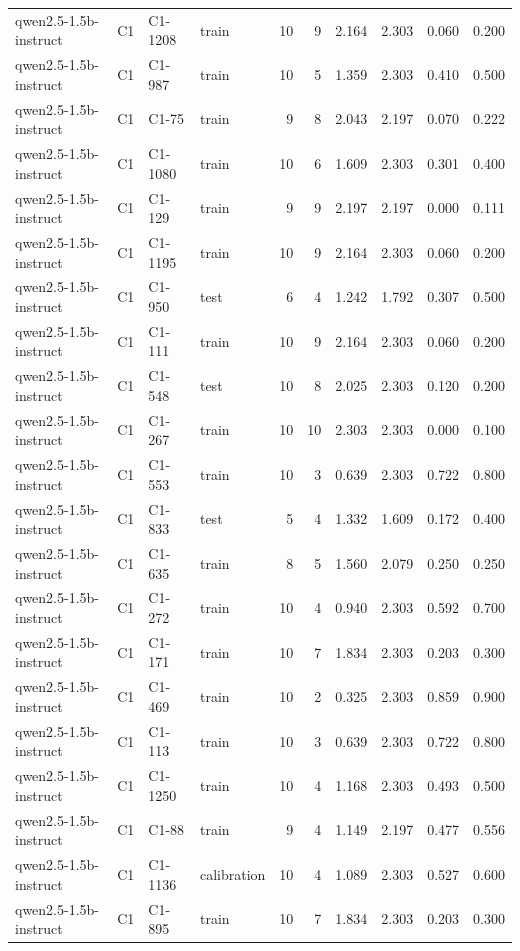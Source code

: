 \begin{table}
\begin{tabular}{llllrrrrrr}
qwen2.5-1.5b-instruct & C1 & C1-1208 & train & 10 & 9 & 2.164 & 2.303 & 0.060 & 0.200 \\
qwen2.5-1.5b-instruct & C1 & C1-987 & train & 10 & 5 & 1.359 & 2.303 & 0.410 & 0.500 \\
qwen2.5-1.5b-instruct & C1 & C1-75 & train & 9 & 8 & 2.043 & 2.197 & 0.070 & 0.222 \\
qwen2.5-1.5b-instruct & C1 & C1-1080 & train & 10 & 6 & 1.609 & 2.303 & 0.301 & 0.400 \\
qwen2.5-1.5b-instruct & C1 & C1-129 & train & 9 & 9 & 2.197 & 2.197 & 0.000 & 0.111 \\
qwen2.5-1.5b-instruct & C1 & C1-1195 & train & 10 & 9 & 2.164 & 2.303 & 0.060 & 0.200 \\
qwen2.5-1.5b-instruct & C1 & C1-950 & test & 6 & 4 & 1.242 & 1.792 & 0.307 & 0.500 \\
qwen2.5-1.5b-instruct & C1 & C1-111 & train & 10 & 9 & 2.164 & 2.303 & 0.060 & 0.200 \\
qwen2.5-1.5b-instruct & C1 & C1-548 & test & 10 & 8 & 2.025 & 2.303 & 0.120 & 0.200 \\
qwen2.5-1.5b-instruct & C1 & C1-267 & train & 10 & 10 & 2.303 & 2.303 & 0.000 & 0.100 \\
qwen2.5-1.5b-instruct & C1 & C1-553 & train & 10 & 3 & 0.639 & 2.303 & 0.722 & 0.800 \\
qwen2.5-1.5b-instruct & C1 & C1-833 & test & 5 & 4 & 1.332 & 1.609 & 0.172 & 0.400 \\
qwen2.5-1.5b-instruct & C1 & C1-635 & train & 8 & 5 & 1.560 & 2.079 & 0.250 & 0.250 \\
qwen2.5-1.5b-instruct & C1 & C1-272 & train & 10 & 4 & 0.940 & 2.303 & 0.592 & 0.700 \\
qwen2.5-1.5b-instruct & C1 & C1-171 & train & 10 & 7 & 1.834 & 2.303 & 0.203 & 0.300 \\
qwen2.5-1.5b-instruct & C1 & C1-469 & train & 10 & 2 & 0.325 & 2.303 & 0.859 & 0.900 \\
qwen2.5-1.5b-instruct & C1 & C1-113 & train & 10 & 3 & 0.639 & 2.303 & 0.722 & 0.800 \\
qwen2.5-1.5b-instruct & C1 & C1-1250 & train & 10 & 4 & 1.168 & 2.303 & 0.493 & 0.500 \\
qwen2.5-1.5b-instruct & C1 & C1-88 & train & 9 & 4 & 1.149 & 2.197 & 0.477 & 0.556 \\
qwen2.5-1.5b-instruct & C1 & C1-1136 & calibration & 10 & 4 & 1.089 & 2.303 & 0.527 & 0.600 \\
qwen2.5-1.5b-instruct & C1 & C1-895 & train & 10 & 7 & 1.834 & 2.303 & 0.203 & 0.300 \\

\end{tabular}
\end{table}
